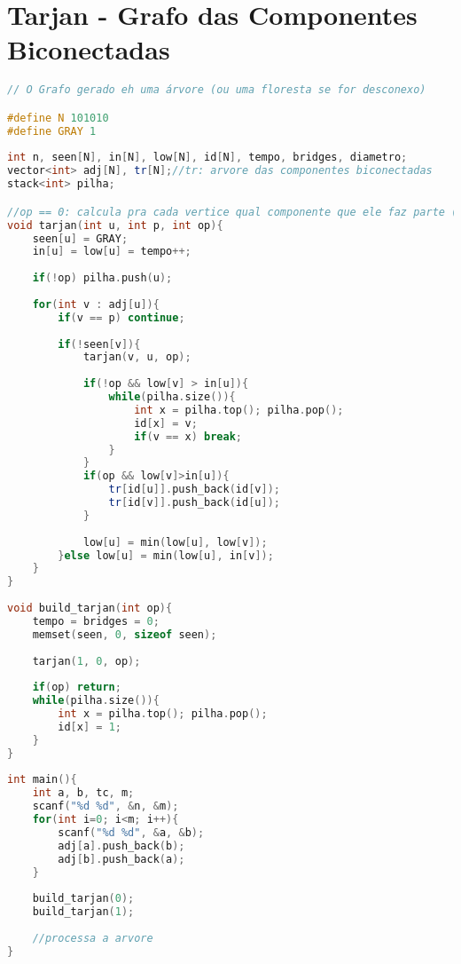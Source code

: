 \documentclass[12pt,a4paper,twoside]{report}
\begin{document}
\section{Tarjan - Grafo das Componentes Biconectadas}
\noindent\begin{lstlisting}[caption=Tarjan - Grafo das Componentes Biconectadas,language=C++]
// O Grafo gerado eh uma árvore (ou uma floresta se for desconexo)

#define N 101010
#define GRAY 1
 
int n, seen[N], in[N], low[N], id[N], tempo, bridges, diametro;
vector<int> adj[N], tr[N];//tr: arvore das componentes biconectadas
stack<int> pilha;

//op == 0: calcula pra cada vertice qual componente que ele faz parte (id) 
void tarjan(int u, int p, int op){
    seen[u] = GRAY;
    in[u] = low[u] = tempo++;
     
    if(!op) pilha.push(u);
     
    for(int v : adj[u]){
        if(v == p) continue;
         
        if(!seen[v]){
            tarjan(v, u, op);
             
            if(!op && low[v] > in[u]){
                while(pilha.size()){
                    int x = pilha.top(); pilha.pop();
                    id[x] = v;
                    if(v == x) break;
                }
            }
            if(op && low[v]>in[u]){
                tr[id[u]].push_back(id[v]);
                tr[id[v]].push_back(id[u]);
            }
             
            low[u] = min(low[u], low[v]);
        }else low[u] = min(low[u], in[v]);
    }
}
 
void build_tarjan(int op){
    tempo = bridges = 0;
    memset(seen, 0, sizeof seen);
     
    tarjan(1, 0, op);
     
    if(op) return;
    while(pilha.size()){
        int x = pilha.top(); pilha.pop();
        id[x] = 1;
    }
}
 
int main(){
    int a, b, tc, m;
    scanf("%d %d", &n, &m);
    for(int i=0; i<m; i++){
        scanf("%d %d", &a, &b);
        adj[a].push_back(b);
        adj[b].push_back(a);
    }
     
    build_tarjan(0);
    build_tarjan(1);
     
    //processa a arvore
}
\end{lstlisting}
\end{document}
